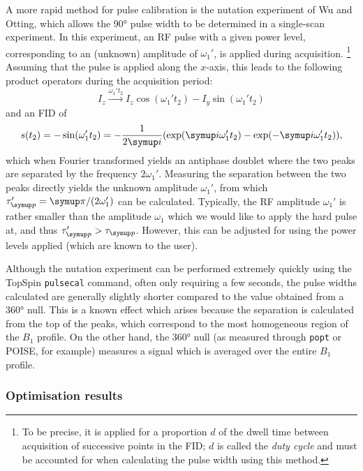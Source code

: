 A more rapid method for pulse calibration is the nutation experiment of Wu and Otting\autocite{Wu2005JMR}, which allows the \ang{90} pulse width to be determined in a single-scan experiment.
In this experiment, an RF pulse with a given power level, corresponding to an (unknown) amplitude of $\omega_1'$, is applied during acquisition.%
\footnote{To be precise, it is applied for a proportion $d$ of the dwell time between acquisition of successive points in the FID; $d$ is called the \textit{duty cycle} and must be accounted for when calculating the pulse width using this method.}
Assuming that the pulse is applied along the $x$-axis, this leads to the following product operators during the acquisition period:
\begin{equation}
    \label{eq:pulsecal_operators}
    I_z \xrightarrow{\omega_1' t_2} I_z \cos(\omega_1' t_2) - I_y \sin(\omega_1' t_2)
\end{equation}
and an FID of
\begin{equation}
    \label{eq:pulsecal_signal}
    s(t_2) = -\sin(\omega_1't_2) = -\frac{1}{2\mi}(\exp(\mi \omega_1' t_2) - \exp(-\mi \omega_1' t_2)),
\end{equation}
which when Fourier transformed yields an antiphase doublet where the two peaks are separated by the frequency $2\omega_1'$.
Measuring the separation between the two peaks directly yields the unknown amplitude $\omega_1'$, from which $\taup' = \cpi/(2\omega_1')$ can be calculated.
Typically, the RF amplitude $\omega_1'$ is rather smaller than the amplitude $\omega_1$ which we would like to apply the hard pulse at, and thus $\taup' > \taup$.
However, this can be adjusted for using the power levels applied (which are known to the user).

Although the nutation experiment can be performed extremely quickly using the TopSpin \texttt{pulsecal} command, often only requiring a few seconds, the pulse widths calculated are generally slightly shorter compared to the value obtained from a \ang{360} null.
This is a known effect which arises because the separation is calculated from the top of the peaks, which correspond to the most homogeneous region of the $B_1$ profile.\autocite{Wu2005JMR}
On the other hand, the \ang{360} null (as measured through \texttt{popt} or POISE, for example) measures a signal which is averaged over the entire $B_1$ profile.


\subsubsection{Optimisation results}

